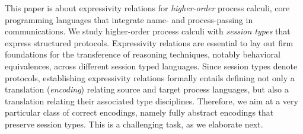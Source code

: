 \noi 
This paper is about expressivity relations for 
\emph{higher-order} process calculi, core programming languages that 
integrate name- and process-passing in communications.
We study higher-order process calculi with \emph{session types} that express structured protocols. 
Expressivity relations are essential to lay out firm foundations for the transference of reasoning techniques, notably behavioral equivalences, across different session typed languages.
Since session types denote protocols, 
 establishing expressivity relations formally entails defining 
 not only a translation (\emph{encoding})
relating source and target process languages, but also a translation 
relating their associated type disciplines. 
Therefore, we aim at a very particular class of correct encodings, namely fully abstract encodings that preserve session types.
This is a challenging task, as we elaborate next.


